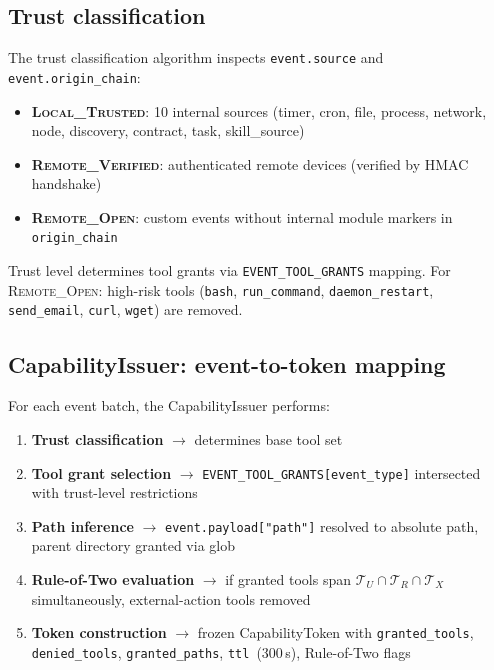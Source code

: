 \documentclass[pdflatex,sn-nature]{sn-jnl}%
\theoremstyle{thmstyleone}%
\theoremstyle{thmstyletwo}%
\theoremstyle{thmstylethree}%
\begin{document}
\subsection{Trust classification}\label{subsec:meth-trust}

The trust classification algorithm inspects \texttt{event.source} and \texttt{event.origin\_chain}:
\begin{itemize}
  \item \textbf{\textsc{Local\_Trusted}}: 10 internal sources (timer, cron, file, process, network, node, discovery, contract, task, skill\_source)
  \item \textbf{\textsc{Remote\_Verified}}: authenticated remote devices (verified by HMAC handshake)
  \item \textbf{\textsc{Remote\_Open}}: custom events without internal module markers in \texttt{origin\_chain}
\end{itemize}
Trust level determines tool grants via \texttt{EVENT\_TOOL\_GRANTS} mapping. For \textsc{Remote\_Open}: high-risk tools (\texttt{bash}, \texttt{run\_command}, \texttt{daemon\_restart}, \texttt{send\_email}, \texttt{curl}, \texttt{wget}) are removed.

\subsection{CapabilityIssuer: event-to-token mapping}\label{subsec:meth-issuer}

For each event batch, the CapabilityIssuer performs:
\begin{enumerate}
  \item \textbf{Trust classification} $\rightarrow$ determines base tool set
  \item \textbf{Tool grant selection} $\rightarrow$ \texttt{EVENT\_TOOL\_GRANTS[event\_type]} intersected with trust-level restrictions
  \item \textbf{Path inference} $\rightarrow$ \texttt{event.payload["path"]} resolved to absolute path, parent directory granted via glob
  \item \textbf{Rule-of-Two evaluation} $\rightarrow$ if granted tools span $\mathcal{T}_U \cap \mathcal{T}_R \cap \mathcal{T}_X$ simultaneously, external-action tools removed
  \item \textbf{Token construction} $\rightarrow$ frozen CapabilityToken with \texttt{granted\_tools}, \texttt{denied\_tools}, \texttt{granted\_paths}, \texttt{ttl}~(300\,s), Rule-of-Two flags
\end{enumerate}
\end{document}
